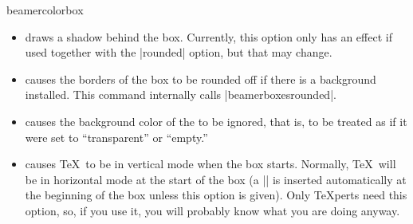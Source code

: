 \begin{environment}{{beamercolorbox}}
\begin{itemize}
    A typical example usage of this option arises when you insert a
    box with a coloured background in the middle of normal text. In
    this case, if the background color is set, you would like a
    background to be drawn behind the text \emph{and} you would like a
    certain extra space around this text (the background should not
    stop immediately at the borders of the text, this looks silly)
    \emph{and} you would like the normal text always to be at the same 
    horizontal position, independently of whether a background is
    present or not. In this case, using |colsep*=4pt| is a good
    option.
  \item {} draws a shadow
    behind the box. Currently, this option only has an effect if
    used together with the |rounded| option, but that may change.
  \item {} causes the
    borders of the box to be rounded off if there is a background
    installed. This command internally calls |beamerboxesrounded|.
  \item {} causes the background color of the
     to be ignored, that is, to be treated as if it
    were set to ``transparent'' or ``empty.''
  \item {} causes \TeX\ to be in vertical mode when the
    box starts. Normally, \TeX\ will be in horizontal mode at the
    start of the box (a |\leavevmode| is inserted automatically at the
    beginning of the box unless this option is given). Only
    \TeX perts need this option, so, if you use it, you will
    probably know what you are doing anyway.
  \end{itemize}
\end{environment}


